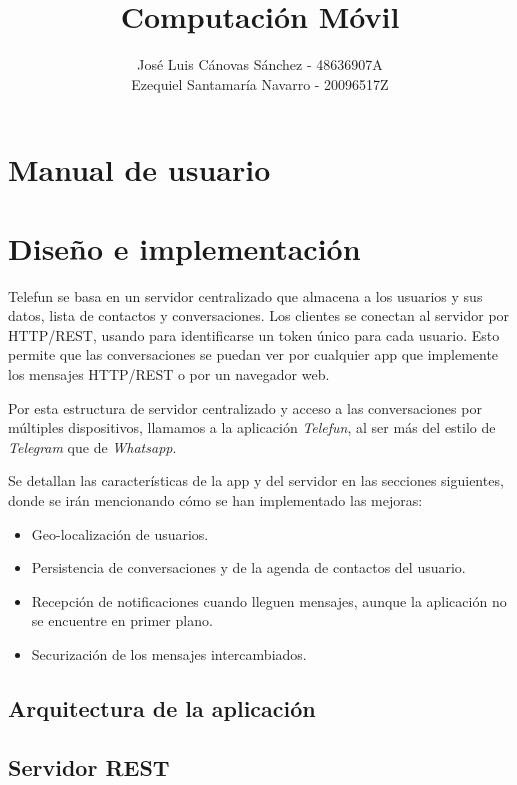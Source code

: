 \documentclass[]{article}
\title{Computación Móvil}
\author{José Luis Cánovas Sánchez - 48636907A\\Ezequiel Santamaría Navarro - 20096517Z}
\begin{document}
\maketitle


\tableofcontents

\section{Manual de usuario}

\section{Diseño e implementación}

Telefun se basa en un servidor centralizado que almacena a los usuarios y sus datos, lista de contactos y conversaciones. Los clientes se conectan al servidor por HTTP/REST, usando para identificarse un token único para cada usuario. Esto permite que las conversaciones se puedan ver por cualquier app que implemente los mensajes HTTP/REST o por un navegador web.

Por esta estructura de servidor centralizado y acceso a las conversaciones por múltiples dispositivos, llamamos a la aplicación \textit{Telefun}, al ser más del estilo de \textit{Telegram} que de \textit{Whatsapp}.

Se detallan las características de la app y del servidor en las secciones siguientes, donde se irán mencionando cómo se han implementado las mejoras:
\begin{itemize}
	\item Geo-localización de usuarios.
	\item Persistencia de conversaciones y de la agenda de contactos del usuario.
	\item Recepción de notificaciones cuando lleguen mensajes, aunque la aplicación no se encuentre en primer plano.
	\item Securización de los mensajes intercambiados.
\end{itemize}

\subsection{Arquitectura de la aplicación}

\subsection{Servidor REST}
\end{document}
